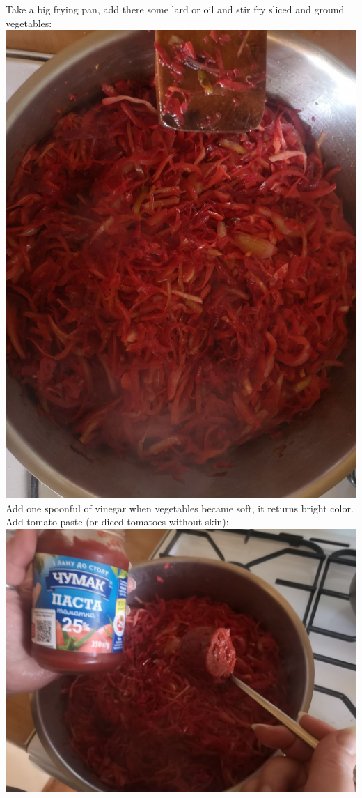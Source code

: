 \documentclass[11pt,a4paper]{article}
\begin{document}
Take a big frying pan, add there some lard or oil and stir fry sliced and ground vegetables: \\
\includegraphics[width=\textwidth]{9.jpg} \\
Add one spoonful of vinegar when vegetables became soft, it returns bright color. Add tomato paste (or diced tomatoes without skin): \\
\includegraphics[width=\textwidth]{10.jpg} \\
\end{document}
